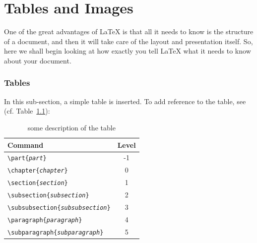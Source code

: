 \chapter{Tables and Images}
One of the great advantages of \LaTeX{} is that all it needs to know is
the structure of a document, and then it will take care of the layout
and presentation itself.  So, here we shall begin looking at how exactly
you tell \LaTeX{} what it needs to know about your document.

\subsection{Tables}
In this sub-section, a simple table is inserted. To add reference to the table, see (cf. Table~\hyperref[tab:table example]{\ref{tab:table example}}):

\begin{table}[htb]
    \centering
    \begin{tabular}{|p{}|c|}
        
        \hline  %
        Command & Level \\ \hline  %
        \texttt{\textbackslash part\{\emph{part}\}} & -1 \\
        \texttt{\textbackslash chapter\{\emph{chapter}\}} & 0 \\
        \texttt{\textbackslash section\{\emph{section}\}} & 1 \\
        \texttt{\textbackslash subsection\{\emph{subsection}\}} & 2 \\
        \texttt{\textbackslash subsubsection\{\emph{subsubsection}\}} & 3 \\
        \texttt{\textbackslash paragraph\{\emph{paragraph}\}} & 4 \\
        \texttt{\textbackslash subparagraph\{\emph{subparagraph}\}} & 5 \\
        \hline
        
    \end{tabular}
    \caption{some description of the table}
    \label{tab:table example}
\end{table}

